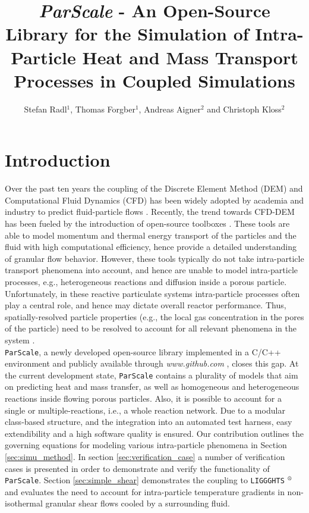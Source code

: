 \documentclass{particles2015}
\title{\textit{ParScale} - An Open-Source Library for the Simulation of Intra-Particle Heat and Mass Transport Processes in Coupled Simulations}
\author{Stefan Radl$^{1}$, Thomas Forgber$^{1}$, Andreas Aigner$^{2}$ and Christoph Kloss$^{2}$}
\begin{document}
\maketitle
\thispagestyle{empty}

\section{Introduction}
\label{sec:introduction}
Over the past ten years the coupling of the Discrete Element Method (DEM) and Computational Fluid Dynamics (CFD)  has been widely adopted by academia and industry to predict fluid-particle flows \cite{Wu2014}. Recently, the trend towards CFD-DEM has been fueled by the introduction of open-source toolboxes \cite{Kloss2012}. These tools are able to model momentum and thermal energy transport of the particles and the fluid with high computational efficiency, hence provide a detailed understanding of granular flow behavior. However, these tools typically do not take intra-particle transport phenomena into account, and hence are unable to model intra-particle processes, e.g., heterogeneous reactions and diffusion inside a porous particle. Unfortunately, in these reactive particulate systems intra-particle processes often play a central role, and hence may dictate overall reactor performance. Thus, spatially-resolved particle properties (e.g., the local gas concentration in the pores of the particle) need to be resolved to account for all relevant phenomena in the system \cite{Dixon2007}. \\
\texttt{ParScale}, a newly developed open-source library implemented in a C/C++ environment and publicly available through \textit{www.github.com} \cite{ParScale_Public}, closes this gap. At the current development state, \texttt{ParScale} contains a plurality of models that aim on predicting heat and mass transfer, as well as homogeneous and heterogeneous reactions inside flowing porous particles. Also, it is possible to account for a single or multiple-reactions, i.e., a whole reaction network. Due to a modular class-based structure, and the integration into an automated test harness, easy extendibility and a high software quality is ensured. Our contribution outlines the governing equations for modeling various intra-particle phenomena in Section \ref{sec:simu_method}. In section \ref{sec:verification_case} a number of verification cases is presented in order to demonstrate and verify the functionality of \texttt{ParScale}. Section \ref{sec:simple_shear} demonstrates the coupling to \texttt{LIGGGHTS} $\textsuperscript{\textregistered}$ and evaluates the need to account for intra-particle temperature gradients in non-isothermal granular shear flows cooled by a surrounding fluid.  
\end{document}
